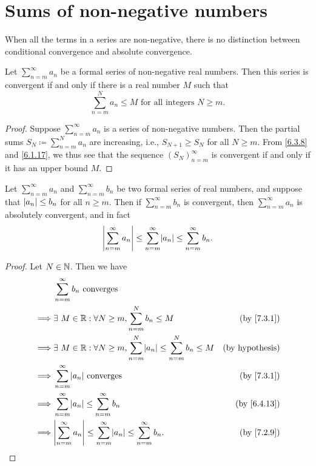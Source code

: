 \section{Sums of non-negative numbers}\label{sec:7.3}

\begin{note}
  When all the terms in a series are non-negative, there is no distinction between conditional convergence and absolute convergence.
\end{note}

\begin{prop}\label{7.3.1}
  Let \(\sum_{n = m}^\infty a_n\) be a formal series of non-negative real numbers.
  Then this series is convergent if and only if there is a real number \(M\) such that
  \[
    \sum_{n = m}^N a_n \leq M \text{ for all integers } N \geq m.
  \]
\end{prop}

\begin{proof}
  Suppose \(\sum_{n = m}^\infty a_n\) is a series of non-negative numbers.
  Then the partial sums \(S_N \coloneqq \sum_{n = m}^N a_n\) are increasing, i.e., \(S_{N + 1} \geq S_N\) for all \(N \geq m\).
  From \cref{6.3.8} and \cref{6.1.17}, we thus see that the sequence \((S_N)_{n = m}^\infty\) is convergent if and only if it has an upper bound \(M\).
\end{proof}

\begin{cor}\label{7.3.2}
  Let \(\sum_{n = m}^\infty a_n\) and \(\sum_{n = m}^\infty b_n\) be two formal series of real numbers, and suppose that \(\left\lvert a_n\right\rvert \leq b_n\) for all \(n \geq m\).
  Then if \(\sum_{n = m}^\infty b_n\) is convergent, then \(\sum_{n = m}^\infty a_n\) is absolutely convergent, and in fact
  \[
    \abs{\sum_{n = m}^\infty a_n} \leq \sum_{n = m}^\infty \abs{a_n} \leq \sum_{n = m}^\infty b_n.
  \]
\end{cor}

\begin{proof}
  Let \(N \in \mathbb{N}\).
  Then we have
  \begin{align*}
             & \sum_{n = m}^\infty b_n \text{ converges}                                                                                  \\
    \implies & \exists\ M \in \R : \forall N \geq m, \sum_{n = m}^N b_n \leq M                                & \text{(by \cref{7.3.1})}  \\
    \implies & \exists\ M \in \R : \forall N \geq m, \sum_{n = m}^N \abs{a_n} \leq \sum_{n = m}^N b_n \leq M  & \text{(by hypothesis)}    \\
    \implies & \sum_{n = m}^\infty \abs{a_n} \text{ converges}                                                & \text{(by \cref{7.3.1})}  \\
    \implies & \sum_{n = m}^\infty \abs{a_n} \leq \sum_{n = m}^\infty b_n                                     & \text{(by \cref{6.4.13})} \\
    \implies & \abs{\sum_{n = m}^\infty a_n} \leq \sum_{n = m}^\infty \abs{a_n} \leq \sum_{n = m}^\infty b_n. & \text{(by \cref{7.2.9})}
  \end{align*}
\end{proof}

